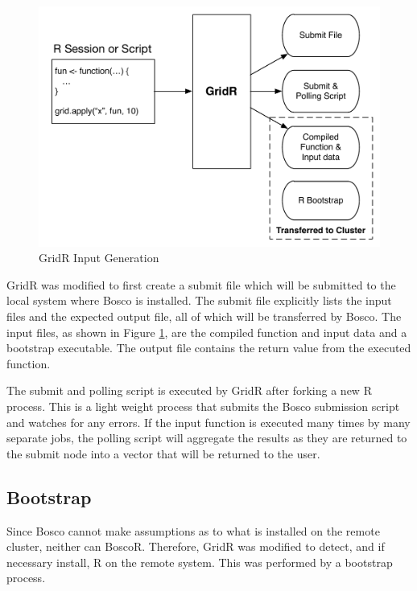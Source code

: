 \begin{figure}[h!t]
\centering
\includegraphics[width=\textwidth]{BoscoRImages/InputDiagram.pdf}
\caption{GridR Input Generation}
\label{fig:gridrinput}
\end{figure}

GridR was modified to first create a submit file which will be submitted to the local system where Bosco is installed.  The submit file explicitly lists the input files and the expected output file, all of which will be transferred by Bosco.  The input files, as shown in Figure \ref{fig:gridrinput}, are the compiled function and input data and a bootstrap executable.  The output file contains the return value from the executed function.

The submit and polling script is executed by GridR after forking a new R process.  This is a light weight process that submits the Bosco submission script and watches for any errors.  If the input function is executed many times by many separate jobs, the polling script will aggregate the results as they are returned to the submit node into a vector that will be returned to the user.  

\subsection{Bootstrap}
\label{sec:boscorbootstrap}

Since Bosco cannot make assumptions as to what is installed on the remote cluster, neither can BoscoR.  Therefore, GridR was modified to detect, and if necessary install, R on the remote system.  This was performed by a bootstrap process.

